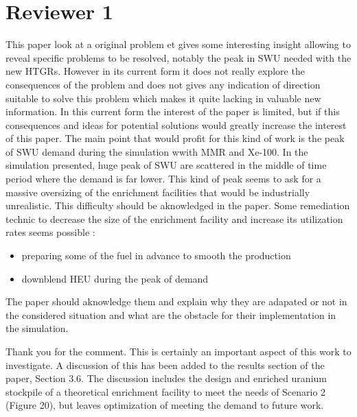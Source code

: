 \documentclass[answers,11pt]{exam}
\begin{document}
\section*{Reviewer 1}
\begin{questions}

        \question This paper look at a original problem et gives some 
        interesting insight allowing to reveal specific problems to be resolved, 
        notably the peak in SWU needed with the new HTGRs. However in its 
        current form it does not really explore the consequences of the problem 
        and does not gives any indication of direction suitable to solve this 
        problem which makes it quite lacking in valuable new information.
        In this current form the interest of the paper is limited, but if this 
        consequences and ideas for potential solutions would greatly increase 
        the interest of this paper. The main point that would profit for this 
        kind of work is the peak of SWU demand during the simulation wwith MMR 
        and Xe-100. In the simulation presented, huge peak of SWU are scattered 
        in the middle of time period where the demand is far lower. This kind of 
        peak seems to ask for a massive oversizing of the enrichment facilities 
        that would be industrially unrealistic. This difficulty should be 
        aknowledged in the paper. Some remediation technic to decrease the 
        size of the enrichment facility and increase its utilization rates seems 
        possible :
        \begin{itemize}
                \item preparing some of the fuel in advance to smooth the production
                \item downblend HEU during the peak of demand 
        \end{itemize}
        The paper should aknowledge them and explain why they are adapated or 
        not in the considered situation and what are the obstacle for their 
        implementation in the simulation.
        \begin{solution}
                Thank you for the comment. This is certainly an important aspect of 
                this work to investigate. A discussion of this has been added 
                to the results section of the paper, Section 3.6. The discussion includes 
                the design and enriched uranium stockpile of a theoretical enrichment 
                facility to meet the needs of Scenario 2 (Figure 20),
                but leaves optimization of meeting the demand to future work. 
        \end{solution}


\end{questions}
\end{document}
